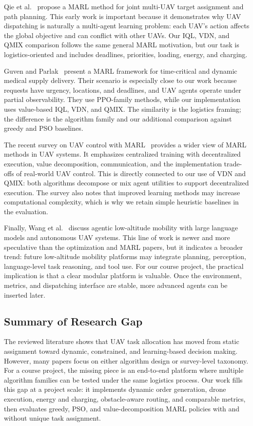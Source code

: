 \documentclass[sigconf,balance=false]{aamas}
\begin{document}
Qie et al.~\cite{qie2019joint} propose a MARL method for joint multi-UAV target assignment and path planning. This early work is important because it demonstrates why UAV dispatching is naturally a multi-agent learning problem: each UAV's action affects the global objective and can conflict with other UAVs. Our IQL, VDN, and QMIX comparison follows the same general MARL motivation, but our task is logistics-oriented and includes deadlines, priorities, loading, energy, and charging.

Guven and Parlak~\cite{uavmarl2026} present a MARL framework for time-critical and dynamic medical supply delivery. Their scenario is especially close to our work because requests have urgency, locations, and deadlines, and UAV agents operate under partial observability. They use PPO-family methods, while our implementation uses value-based IQL, VDN, and QMIX. The similarity is the logistics framing; the difference is the algorithm family and our additional comparison against greedy and PSO baselines.

The recent survey on UAV control with MARL~\cite{marlcontrolsurvey2025} provides a wider view of MARL methods in UAV systems. It emphasizes centralized training with decentralized execution, value decomposition, communication, and the implementation trade-offs of real-world UAV control. This is directly connected to our use of VDN and QMIX: both algorithms decompose or mix agent utilities to support decentralized execution. The survey also notes that improved learning methods may increase computational complexity, which is why we retain simple heuristic baselines in the evaluation.

Finally, Wang et al.~\cite{agenticuav2025} discuss agentic low-altitude mobility with large language models and autonomous UAV systems. This line of work is newer and more speculative than the optimization and MARL papers, but it indicates a broader trend: future low-altitude mobility platforms may integrate planning, perception, language-level task reasoning, and tool use. For our course project, the practical implication is that a clear modular platform is valuable. Once the environment, metrics, and dispatching interface are stable, more advanced agents can be inserted later.

\subsection{Summary of Research Gap}

The reviewed literature shows that UAV task allocation has moved from static assignment toward dynamic, constrained, and learning-based decision making. However, many papers focus on either algorithm design or survey-level taxonomy. For a course project, the missing piece is an end-to-end platform where multiple algorithm families can be tested under the same logistics process. Our work fills this gap at a project scale: it implements dynamic order generation, drone execution, energy and charging, obstacle-aware routing, and comparable metrics, then evaluates greedy, PSO, and value-decomposition MARL policies with and without unique task assignment.
\end{document}
